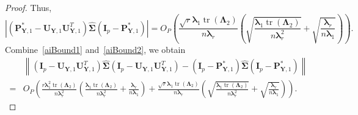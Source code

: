\documentclass[12pt]{article} %
\DeclareMathOperator{\mytr}{tr}
\newcommand{\bP}{\mathbf{P}}
\newcommand{\bY}{\mathbf{Y}}
\newcommand{\bI}{\mathbf{I}}
\newcommand{\bU}{\mathbf{U}}
\newcommand{\bfsym}[1]{\ensuremath{\boldsymbol{#1}}}
\def\blambda {\bfsym {\lambda}}
\def\bLambda {\bfsym {\Lambda}}
\def\bSigma {\bfsym {\Sigma}}
\theoremstyle{definition}
\begin{document}
\begin{appendices}
\begin{proof}
    Thus,
    \begin{equation}\label{aiBound2}
    \left|(\bP^*_{\bY,1}-\bU_{\bY,1}\bU_{\bY,1}^T)\hat{\bSigma}(\bI_p-\bP^*_{\bY,1})\right|
             =O_P\left(
                    \frac{\sqrt{r}\blambda_1 \mytr(\bLambda_2)}{n \blambda_r}
                    \left(
\sqrt{\frac{\blambda_1 \mytr(\bLambda_2)}{n\blambda_r^2}}
+\sqrt{\frac{\blambda_r}{n\blambda_1}}
                    \right)
                \right).
    \end{equation}
    Combine~\eqref{aiBound1} and~\eqref{aiBound2}, we obtain
    \begin{equation*}
        \begin{split}
             &\left\|(\bI_p -\bU_{\bY,1}\bU_{\bY,1}^T)\hat{\bSigma}(\bI_p -\bU_{\bY,1}\bU_{\bY,1}^T)
             -
             (\bI_p-\bP^*_{\bY,1})\hat{\bSigma}(\bI_p-\bP^*_{\bY,1})\right\|
             \\
             =&
             O_P\left(
                    \frac{r\blambda_1^2 \mytr(\bLambda_2)}{n\blambda_r^2}
                    \left(
\frac{\blambda_1 \mytr(\bLambda_2)}{n\blambda_r^2}
+\frac{\blambda_r}{n\blambda_1}
                    \right)
                 +\frac{\sqrt{r} \blambda_1 \mytr(\bLambda_2)}{n \blambda_r}
                    \left(
\sqrt{\frac{\blambda_1 \mytr(\bLambda_2)}{n\blambda_r^2}}
+\sqrt{\frac{\blambda_r}{n\blambda_1}}
                    \right)
                \right).
        \end{split}
    \end{equation*}


\end{proof}
\end{appendices}
\end{document}

